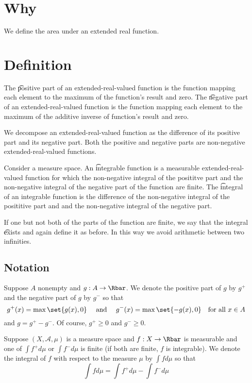 
\section*{Why}

We define the area under an extended real function.

\section*{Definition}

The \t{positive part} of an extended-real-valued function is the function mapping each element to the maximum of the function's result and zero.
The \t{negative part} of an extended-real-valued function is the function mapping each element to the maximum of the additive inverse of function's result and zero.

We decompose an extended-real-valued function as the difference of its positive part and its negative part.
Both the positive and negative parts are non-negative extended-real-valued functions.

Consider a measure space.
An \t{integrable} function is a measurable extended-real-valued function for which the non-negative integral of the posititve part and the non-negative integral of the negative part of the function are finite.
The \t{integral} of an integrable function is the difference of the non-negative integral of the posititive part and and the non-negative integral of the negative part.

If one but not both of the parts of the function are finite, we say that the integral \t{exists} and again define it as before.
In this way we avoid arithmetic between two infinities.

\subsection*{Notation}

Suppose $A$ nonempty and $g: A \to \Rbar$.
We denote the positive part of $g$ by $g^+$ and the negative part of $g$ by $g^-$ so that
\[
g^+(x) = \max\set{g(x), 0}
\quad \text{ and } \quad
g^-(x) = \max\set{-g(x), 0} \quad \text{for all } x \in A
\]
and $g = g^+ - g^-$.
Of course, $g^+ \geq 0$ and $g^- \geq 0$.

Suppose $(X, \mathcal{A} , \mu )$ is a measure space and $f: X \to \Rbar$ is measurable and one of $\int  f^+ d \mu $ or $\int  f^- d \mu $ is finite (if both are finite, $f$ is integrable).
We denote the integral of $f$ with respect to the measure $\mu $ by $\int  f d\mu $ so that
\[
\int  f d\mu  = \int  f^+ d\mu  - \int  f^- d\mu
\]

